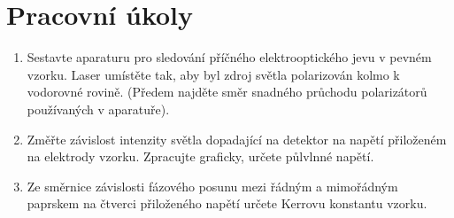 \documentclass[a4paper]{article}
\author{Vladislav Wohlrath}
\begin{document}
\begin{titlepage}

\end{titlepage}

\section*{Pracovní úkoly}
\begin{enumerate}
\item Sestavte aparaturu pro sledování příčného elektrooptického jevu v pevném vzorku. Laser umístěte tak, aby byl zdroj světla polarizován kolmo k vodorovné rovině. (Předem najděte směr snadného průchodu polarizátorů používaných v aparatuře).
\item Změřte závislost intenzity světla dopadající na detektor na napětí přiloženém na elektrody vzorku. Zpracujte graficky, určete půlvlnné napětí.
\item Ze směrnice závislosti fázového posunu mezi řádným a mimořádným paprskem na čtverci přiloženého napětí určete Kerrovu konstantu vzorku.
\end{enumerate}












\printbibliography[title={Seznam použité literatury}]
\end{document}
